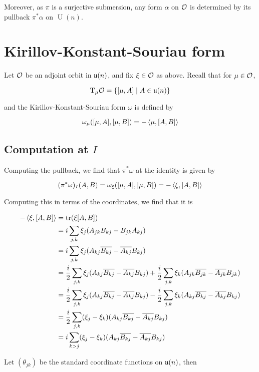 \documentclass{article}
\DeclareMathOperator{\U}{U}
\renewcommand{\u}{\mfu}
\begin{document}
Moreover, as \(\pi\) is a surjective submersion, any form \(\alpha\) on \(\mathcal{O}\) is determined by its pullback \(\pi^*\alpha\) on \(\U(n)\).

\section{Kirillov-Konstant-Souriau form}

Let \(\mathcal{O}\) be an adjoint orbit in \(\u(n)\), and fix \(\xi \in \mathcal{O}\) as above. Recall that for \(\mu \in \mathcal{O}\),

\[\TT_\mu\mcO = \left\{[\mu, A] \mid A \in \u(n)\right\}\]

and the Kirillov-Konstant-Souriau form \(\omega\) is defined by

\[\omega_\mu([\mu, A], [\mu, B]) = -\left\langle \mu, [A, B] \right\rangle\]

\subsection{Computation at \(I\)}

Computing the pullback, we find that \(\pi^*\omega\) at the identity is given by

\[(\pi^*\omega)_I(A, B) = \omega_\xi([\mu, A], [\mu, B]) = -\left\langle \xi, [A, B] \right\rangle\]

Computing this in terms of the coordinates, we find that it is

\begin{align*}
    -\left\langle \xi, [A, B] \right\rangle &= \tr(\xi[A, B]) \\
    &= i\sum_{j, k}\xi_j(A_{jk}B_{kj} - B_{jk}A_{kj}) \\
    &= i\sum_{j, k}\xi_j(A_{kj}\overline{B_{kj}} - \overline{A_{kj}}B_{kj}) \\
    &= \frac{i}{2} \sum_{j,k}\xi_j(A_{kj}\overline{B_{kj}} - \overline{A_{kj}}B_{kj}) + \frac{i}{2}\sum_{j, k}\xi_k(A_{jk} \overline{B_{jk}} - \overline{A_{jk}}B_{jk}) \\
    &= \frac{i}{2} \sum_{j,k}\xi_j(A_{kj}\overline{B_{kj}} - \overline{A_{kj}}B_{kj}) - \frac{i}{2}\sum_{j, k}\xi_k(A_{kj} \overline{B_{kj}} - \overline{A_{kj}}B_{kj}) \\
    &= \frac{i}{2}\sum_{j, k}(\xi_j - \xi_k)(A_{kj}\overline{B_{kj}} - \overline{A_{kj}}B_{kj}) \\
    &= i \sum_{k > j}(\xi_j - \xi_k)(A_{kj}\overline{B_{kj}} - \overline{A_{kj}}B_{kj})
\end{align*}

Let \((\theta_{jk})\) be the standard coordinate functions on \(\u(n)\), then
\end{document}
